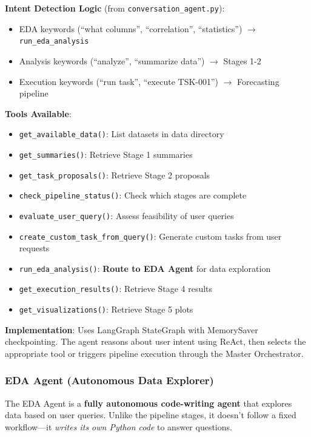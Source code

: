 \documentclass[11pt,a4paper]{article}
\begin{document}
\textbf{Intent Detection Logic} (from \texttt{conversation\_agent.py}):
\begin{itemize}
    \item EDA keywords (``what columns'', ``correlation'', ``statistics'') $\rightarrow$ \texttt{run\_eda\_analysis}
    \item Analysis keywords (``analyze'', ``summarize data'') $\rightarrow$ Stages 1-2
    \item Execution keywords (``run task'', ``execute TSK-001'') $\rightarrow$ Forecasting pipeline
\end{itemize}

\textbf{Tools Available}:
\begin{itemize}
    \item \texttt{get\_available\_data()}: List datasets in data directory
    \item \texttt{get\_summaries()}: Retrieve Stage 1 summaries
    \item \texttt{get\_task\_proposals()}: Retrieve Stage 2 proposals
    \item \texttt{check\_pipeline\_status()}: Check which stages are complete
    \item \texttt{evaluate\_user\_query()}: Assess feasibility of user queries
    \item \texttt{create\_custom\_task\_from\_query()}: Generate custom tasks from user requests
    \item \texttt{run\_eda\_analysis()}: \textbf{Route to EDA Agent} for data exploration
    \item \texttt{get\_execution\_results()}: Retrieve Stage 4 results
    \item \texttt{get\_visualizations()}: Retrieve Stage 5 plots
\end{itemize}

\textbf{Implementation}: Uses LangGraph StateGraph with MemorySaver checkpointing. The agent reasons about user intent using ReAct, then selects the appropriate tool or triggers pipeline execution through the Master Orchestrator.

\subsubsection{EDA Agent (Autonomous Data Explorer)}

The EDA Agent is a \textbf{fully autonomous code-writing agent} that explores data based on user queries. Unlike the pipeline stages, it doesn't follow a fixed workflow---it \textit{writes its own Python code} to answer questions.
\end{document}

